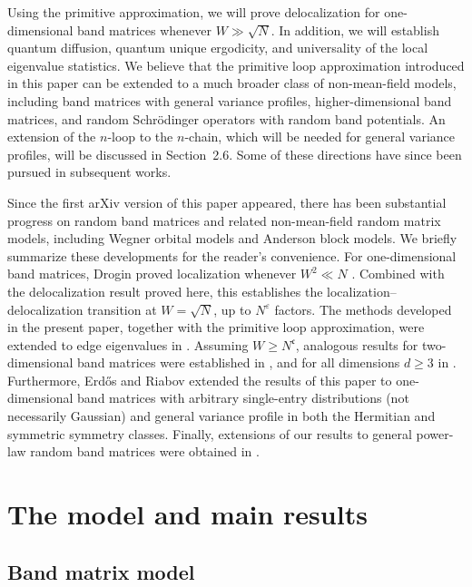 \documentclass[10pt,reqno]{article}
\newcommand{\fc}{{\mathfrak c}}
\theoremstyle{plain} %
\theoremstyle{remark}
\numberwithin{equation}{section}
\begin{document}
Using the primitive approximation, we will prove delocalization for one-dimensional band matrices whenever \(W\gg\sqrt N\). In addition, we will establish quantum diffusion, quantum unique ergodicity, and universality of the local eigenvalue statistics. We believe that the primitive loop approximation introduced in this paper can be extended to a much broader class of non-mean-field models, including band matrices with general variance profiles, higher-dimensional band matrices, and random Schrödinger operators with random band  potentials.  
An extension of the \(n\)-loop to the \(n\)-chain, which will be needed for general variance profiles,  will be discussed in Section~2.6. Some of these directions have since been pursued in subsequent works.

Since the first arXiv version of this paper appeared, there has been substantial progress on random band matrices and related non-mean-field random matrix models, including Wegner orbital models and Anderson block models. We briefly summarize these developments for the reader's convenience. For one-dimensional band matrices, Drogin proved localization whenever \(W^2\ll N\) \cite{Drogin2025LocalizationRBM}. Combined with the delocalization result proved here, this establishes the localization--delocalization transition at \(W=\sqrt N\), up to \(N^\varepsilon\) factors. The methods developed in the present paper, together with the primitive loop approximation, were extended to edge eigenvalues in \cite{YangYin2025EdgeRBM}. Assuming \(W\ge N^{\fc}\), analogous results for two-dimensional band matrices were established in \cite{DubovaYangYauYin2025TwoD}, and for all dimensions \(d\ge3\) in \cite{DubovaYangYauYin2025NonMeanField}. Furthermore, Erd\H{o}s and Riabov \cite{ErdosRiabov2025Zigzag} extended the results of this paper to one-dimensional band matrices with arbitrary single-entry distributions (not necessarily Gaussian) and general variance profile in both the Hermitian and symmetric symmetry classes. Finally,
extensions of our results to general power-law random band matrices were obtained in \cite{FanYangYin2026PowerLawRBM}.



\section{The model and main results}
 \subsection{Band matrix model}\label{subsec_setting}
\end{document}
